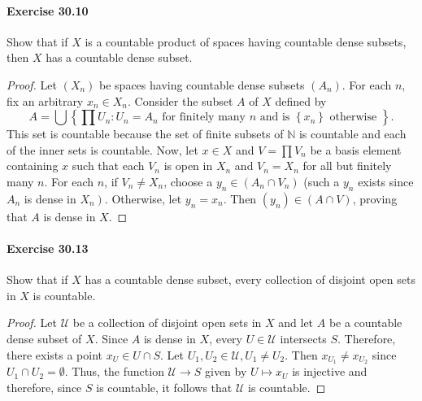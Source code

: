\documentclass{article}
\begin{document}
\paragraph{Exercise 30.10} Show that if $X$ is a countable product of spaces having countable dense subsets, then $X$ has a countable dense subset.
\begin{proof}
    Let $\left(X_n\right)$ be spaces having countable dense subsets $\left(A_n\right)$. For each $n$, fix an arbitrary $x_n \in X_n$. Consider the subset $A$ of $X$ defined by
$$
A=\bigcup\left\{\prod U_n: U_n=A_n \text { for finitely many } n \text { and is }\left\{x_n\right\} \text { otherwise }\right\} .
$$
This set is countable because the set of finite subsets of $\mathbb{N}$ is countable and each of the inner sets is countable. Now, let $x \in X$ and $V=\prod V_n$ be a basis element containing $x$ such that each $V_n$ is open in $X_n$ and $V_n=X_n$ for all but finitely many $n$. For each $n$, if $V_n \neq X_n$, choose a $y_n \in\left(A_n \cap V_n\right)$ (such a $y_n$ exists since $A_n$ is dense in $\left.X_n\right)$. Otherwise, let $y_n=x_n$. Then $\left(y_n\right) \in(A \cap V)$, proving that $A$ is dense in $X$.
\end{proof}



\paragraph{Exercise 30.13} Show that if $X$ has a countable dense subset, every collection of disjoint open sets in $X$ is countable.
\begin{proof}
    Let $\mathcal{U}$ be a collection of disjoint open sets in $X$ and let $A$ be a countable dense subset of $X$.
Since $A$ is dense in $X$, every $U \in \mathcal{U}$ intersects $S$. Therefore, there exists a point $x_U \in U \cap S$.
Let $U_1, U_2 \in \mathcal{U}, U_1 \neq U_2$. Then $x_{U_1} \neq x_{U_2}$ since $U_1 \cap U_2=\emptyset$.
Thus, the function $\mathcal{U} \rightarrow S$ given by $U \mapsto x_U$ is injective and therefore, since $S$ is countable, it follows that $\mathcal{U}$ is countable.
\end{proof}
\end{document}
